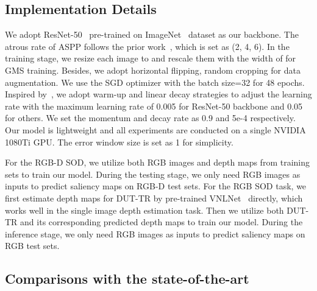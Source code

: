 \documentclass[journal]{IEEEtran}
\begin{document}
\subsection{Implementation Details}

We adopt ResNet-50~\cite{he2016deep} pre-trained on ImageNet~\cite{deng2009imagenet} dataset as our backbone. The atrous rate of ASPP follows the prior work~\cite{chen2017deeplab}, which is set as (2, 4, 6). In the training stage, we resize each image to  and rescale them with the width of  for GMS training. Besides, we adopt horizontal flipping, random cropping for data augmentation.  We use the SGD optimizer with the batch size=32 for 48 epochs. Inspired by~\cite{F3Net,chen2020global}, we adopt warm-up and linear decay strategies to adjust the learning rate with the maximum learning rate of 0.005 for ResNet-50 backbone and 0.05 for others. We set the momentum and decay rate as 0.9 and 5e-4 respectively. Our model is lightweight and all experiments are conducted on a single NVIDIA 1080Ti GPU.  The error window size is set as 1 for simplicity.

For the RGB-D SOD, we utilize both RGB images and depth maps from training sets to train our model. During the testing stage, we only need RGB images as inputs to predict saliency maps on RGB-D test sets. For the RGB SOD task, we first estimate depth maps for DUT-TR by pre-trained VNLNet~\cite{yin2019enforcing} directly, which works well in the single image depth estimation task. Then we utilize both DUT-TR and its corresponding predicted depth maps to train our model. During the inference stage, we only need RGB images as inputs to predict saliency maps on RGB test sets.






\subsection{Comparisons with the state-of-the-art}
\end{document}
